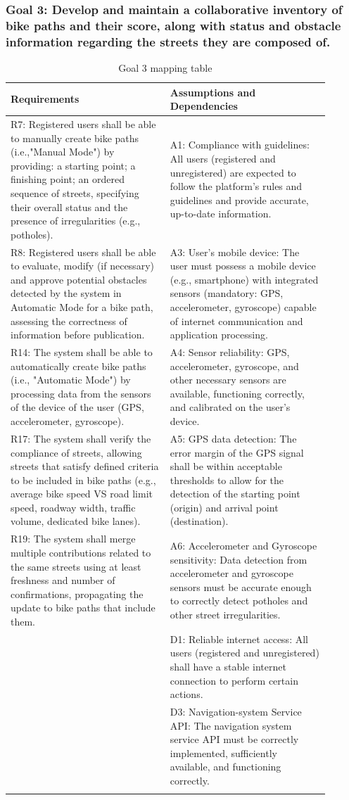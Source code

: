 \documentclass{Configuration_Files/PoliMi3i_thesis}
\begin{document}
    \subsubsection*{Goal 3: Develop and maintain a collaborative inventory of bike paths and their score, along with status and obstacle information regarding the streets they are composed of.}
    \begin{longtable}{|p{0.45\linewidth}|p{0.45\linewidth}|}
    \hline
    \textbf{Requirements} & \textbf{Assumptions and Dependencies} \\ \hline
    R7: Registered users shall be able to manually create bike paths (i.e.,"Manual Mode") by providing: a starting point; a finishing point; an ordered sequence of streets, specifying their overall status and the presence of irregularities (e.g., potholes).&A1: Compliance with guidelines: All users (registered and unregistered) are expected to follow the platform’s rules and guidelines and provide accurate, up-to-date information.\\
    R8: Registered users shall be able to evaluate, modify (if necessary) and approve potential obstacles detected by the system in Automatic Mode for a bike path, assessing the correctness of information before publication.&A3: User’s mobile device: The user must possess a mobile device (e.g., smartphone) with integrated sensors (mandatory: GPS, accelerometer, gyroscope) capable of internet communication and application processing.\\
    R14: The system shall be able to automatically create bike paths (i.e., "Automatic Mode") by processing data from the sensors of the device of the user (GPS, accelerometer, gyroscope).&A4: Sensor reliability: GPS, accelerometer, gyroscope, and other necessary sensors are available, functioning correctly, and calibrated on the user's device.\\
    R17: The system shall verify the compliance of streets, allowing streets that satisfy defined criteria to be included in bike paths (e.g., average bike speed VS road limit speed, roadway width, traffic volume, dedicated bike lanes).&A5: GPS data detection: The error margin of the GPS signal shall be within acceptable thresholds to allow for the detection of the starting point (origin) and arrival point (destination).\\
    R19: The system shall merge multiple contributions related to the same streets using at least freshness and number of confirmations, propagating the update to bike paths that include them.&A6: Accelerometer and Gyroscope sensitivity: Data detection from accelerometer and gyroscope sensors must be accurate enough to correctly detect potholes and other street irregularities.\\
    & D1: Reliable internet access: All users (registered and unregistered) shall have a stable internet connection to perform certain actions.\\
    & D3: Navigation-system Service API: The navigation system service API must be correctly implemented, sufficiently available, and functioning correctly.\\
    \hline
    \caption{Goal 3 mapping table}
    \end{longtable}
    
\end{document}
